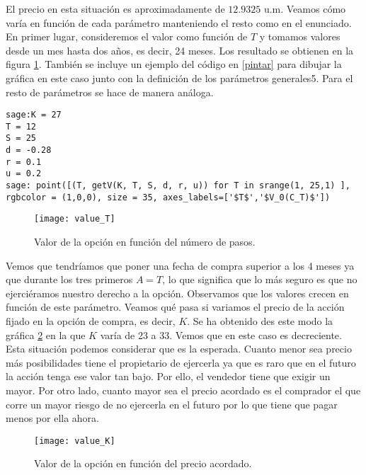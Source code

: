 El precio en esta situación es aproximadamente de $  12.9325 $ u.m. Veamos cómo varía en función de cada parámetro manteniendo el resto como en el enunciado. En primer lugar, consideremos el valor como función de $ T $ y tomamos valores desde un mes hasta dos años, es decir, 24 meses. Los resultado se obtienen en la figura \ref{valueT}. También se incluye un ejemplo del código en \ref{pintar} para dibujar la gráfica en este caso junto con la definición de los parámetros generales5. Para el resto de parámetros se hace de manera análoga. 

\begin{lstlisting}[label={pintar}, caption={Código en Sage para dibujar una gráfica}, morekeywords={sage}]
sage:K = 27
T = 12
S = 25
d = -0.28
r = 0.1
u = 0.2
sage: point([(T, getV(K, T, S, d, r, u)) for T in srange(1, 25,1) ], rgbcolor = (1,0,0), size = 35, axes_labels=['$T$','$V_0(C_T)$'])          	 
\end{lstlisting}

\begin{figure}[h!]
	\centering
	\texttt{[image: value\_T]}
	\caption{Valor de la opción en función del número de pasos.}
	\label{valueT}
\end{figure}

Vemos que tendríamos que poner una fecha de compra superior a los 4 meses ya que durante los tres primeros $ A = T $, lo que significa que lo más seguro es que no ejerciéramos nuestro derecho a la opción. Observamos que los valores crecen en función de este parámetro. Veamos qué pasa si variamos el precio de la acción fijado en la opción de compra, es decir, $ K $. Se ha obtenido des este modo la gráfica \ref{valueK} en la que $ K $ varía de 23 a 33. Vemos que en este caso es decreciente. Esta situación podemos considerar que es la esperada. Cuanto menor sea precio más posibilidades tiene el propietario de ejercerla ya que es raro que en el futuro la acción tenga ese valor tan bajo. Por ello, el vendedor tiene que exigir un mayor. Por otro lado, cuanto mayor sea el precio acordado es el comprador el que corre un mayor riesgo de no ejercerla en el futuro por lo que tiene que pagar menos por ella ahora. 

\begin{figure}[h!]
	\centering
	\texttt{[image: value\_K]}
	\caption{Valor de la opción en función del precio acordado.}
	\label{valueK}
\end{figure} 

